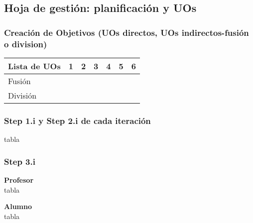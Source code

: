 \subsection{Hoja de gestión: planificación y UOs}
\label{dgp:hoja-de-gestion}

\subsubsection{Creación de Objetivos (UOs directos, UOs indirectos-fusión o division)}
\label{dgp:hoja-de-gestion:a}

\noindent
\begin{tabular}{| l | c | c | c | c | c | c |}
  \hline                       
  Lista de UOs & 1 & 2 & 3 & 4 & 5 & 6 \\
  \hline  
  Fusión &  & &  &  &  &   \\
  \hline  
  División &  &  &  &  &  &  \\
  \hline  
\end{tabular}

\subsubsection{Step 1.i y Step 2.i de cada iteración}
\label{dgp:hoja-de-gestion:b}

tabla

\subsubsection{Step 3.i}
\label{dgp:hoja-de-gestion:c}

\textbf{Profesor}\\
tabla

\textbf{Alumno}\\
tabla
